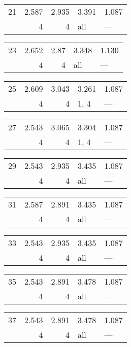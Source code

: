 \begin{tabular}{lrrll}
\toprule
 21 & 2.587 & 2.935 & 3.391 & 1.087 \\
    & 4     & 4     & all   & ---   \\
\bottomrule
\end{tabular}
\begin{tabular}{lrrll}
\toprule
 23 & 2.652 & 2.87 & 3.348 & 1.130 \\
    & 4     & 4    & all   & ---   \\
\bottomrule
\end{tabular}
\begin{tabular}{lrrll}
\toprule
 25 & 2.609 & 3.043 & 3.261 & 1.087 \\
    & 4     & 4     & 1, 4  & ---   \\
\bottomrule
\end{tabular}
\begin{tabular}{lrrll}
\toprule
 27 & 2.543 & 3.065 & 3.304 & 1.087 \\
    & 4     & 4     & 1, 4  & ---   \\
\bottomrule
\end{tabular}
\begin{tabular}{lrrll}
\toprule
 29 & 2.543 & 2.935 & 3.435 & 1.087 \\
    & 4     & 4     & all   & ---   \\
\bottomrule
\end{tabular}
\begin{tabular}{lrrll}
\toprule
 31 & 2.587 & 2.891 & 3.435 & 1.087 \\
    & 4     & 4     & all   & ---   \\
\bottomrule
\end{tabular}
\begin{tabular}{lrrll}
\toprule
 33 & 2.543 & 2.935 & 3.435 & 1.087 \\
    & 4     & 4     & all   & ---   \\
\bottomrule
\end{tabular}
\begin{tabular}{lrrll}
\toprule
 35 & 2.543 & 2.891 & 3.478 & 1.087 \\
    & 4     & 4     & all   & ---   \\
\bottomrule
\end{tabular}
\begin{tabular}{lrrll}
\toprule
 37 & 2.543 & 2.891 & 3.478 & 1.087 \\
    & 4     & 4     & all   & ---   \\
\bottomrule
\end{tabular}
